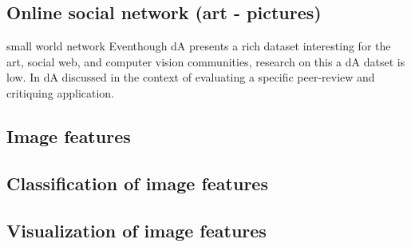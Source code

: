 \subsection{Online social network (art - pictures)}
small world network
Eventhough dA presents a rich dataset interesting for the art, social web, and computer vision communities, research on this a dA datset is low. In \cite{DaMasters} dA discussed in the context of evaluating a specific peer-review and critiquing application.   
\subsection{Image features}
\subsection{Classification of image features}
\subsection{Visualization of image features}